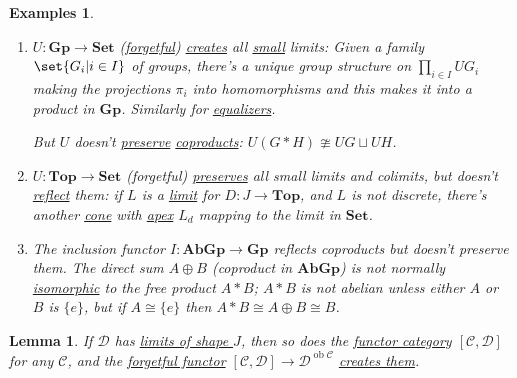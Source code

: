 \documentclass{article}
\DeclareMathOperator{\ob}{ob}
\newtheorem{nlemma}[nthm]{Lemma}
\newtheorem{nexample}[nthm]{Examples}
\begin{document}
\begin{nexample}\label{eg:4.6}\leavevmode
  \begin{enumerate}[label=(\alph*)]
    \item $U: \mathbf{Gp} \to \mathbf{Set}$ (\hyperlink{def:forgFunc}{forgetful}) \hyperlink{def:clim}{creates} all \hyperlink{def:small}{small} limits:
      Given a family $\set{G_i | i \in I}$ of groups, there's a unique group structure on $\prod_{i \in I} UG_i$ making the projections $\pi_i$ into homomorphisms and this makes it into a product in $\mathbf{Gp}$.
      Similarly for \hyperlink{def:equalizer}{equalizers}.

      But $U$ doesn't \hyperlink{def:plim}{preserve} \hyperlink{def:lcoprod}{coproducts}: $U(G * H) \ncong UG \sqcup UH$.
    \item $U: \mathbf{Top} \to \mathbf{Set}$ (forgetful) \hyperlink{def:plim}{preserves} all small limits and colimits, but doesn't \hyperlink{def:rlim}{reflect} them: if $L$ is a \hyperlink{def:limit}{limit} for $D: J \to \mathbf{Top}$, and $L$ is not discrete, there's another \hyperlink{def:cone}{cone} with \hyperlink{def:cone}{apex} $L_d$ mapping to the limit in $\mathbf{Set}$.
    \item The inclusion functor $I: \mathbf{AbGp} \to \mathbf{Gp}$ reflects coproducts but doesn't preserve them.
      The direct sum $A \oplus B$ (coproduct in $\mathbf{AbGp}$) is not normally \hyperlink{def:iso}{isomorphic} to the free product $A * B$; $A*B$ is not abelian unless either $A$ or $B$ is $\{e\}$, but if $A \cong \{e\}$ then $A * B \cong A \oplus B \cong B$.
  \end{enumerate}
\end{nexample}
\begin{nlemma}\label{lem:4.7}
  If $\mathscr{D}$ has \hyperlink{def:limit}{limits of shape $J$}, then so does the \hyperlink{def:functcat}{functor category} $[\mathscr{C}, \mathscr{D}]$ for any $\mathscr{C}$, and the \hyperlink{def:forgFunc}{forgetful functor} $[\mathscr{C}, \mathscr{D}] \to \mathscr{D}^{\ob \mathscr{C}}$ \hyperlink{def:clim}{creates them}.
\end{nlemma}
\end{document}

